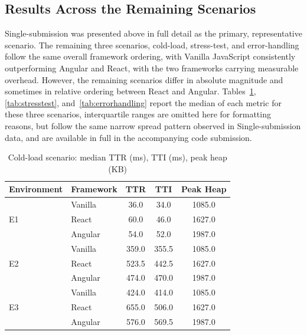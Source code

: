 \documentclass[11pt,a4paper]{report}
\begin{document}
\subsection{Results Across the Remaining Scenarios}
\label{sec:other-scenarios}

Single-submission was presented above in full detail as the primary, representative scenario. The remaining three scenarios, cold-load, stress-test, and error-handling follow the same overall framework ordering, with Vanilla JavaScript consistently outperforming Angular and React, with the two frameworks carrying measurable overhead. However, the remaining scenarios differ in absolute magnitude and sometimes in relative ordering between React and Angular. Tables~\ref{tab:coldload},
\ref{tab:stresstest}, and~\ref{tab:errorhandling} report the median of each metric for these three scenarios, interquartile ranges are omitted here for formatting reasons, but follow the same narrow spread pattern observed in Single-submission data, and are available in full in the accompanying code submission. 

\begin{table}[H]
\centering
\caption{Cold-load scenario: median TTR (ms), TTI (ms), peak heap (KB)}
\label{tab:coldload}
\begin{tabular}{llccc}
\toprule
Environment & Framework & TTR & TTI & Peak Heap \\
\midrule
\multirow{3}{*}{E1} & Vanilla & 36.0  & 34.0  & 1085.0 \\
                     & React   & 60.0  & 46.0  & 1627.0 \\
                     & Angular & 54.0  & 52.0  & 1987.0 \\
\midrule
\multirow{3}{*}{E2} & Vanilla & 359.0 & 355.5 & 1085.0 \\
                     & React   & 523.5 & 442.5 & 1627.0 \\
                     & Angular & 474.0 & 470.0 & 1987.0 \\
\midrule
\multirow{3}{*}{E3} & Vanilla & 424.0 & 414.0 & 1085.0 \\
                     & React   & 655.0 & 506.0 & 1627.0 \\
                     & Angular & 576.0 & 569.5 & 1987.0 \\
\bottomrule
\end{tabular}
\end{table}

\vspace{5mm}
\end{document}
